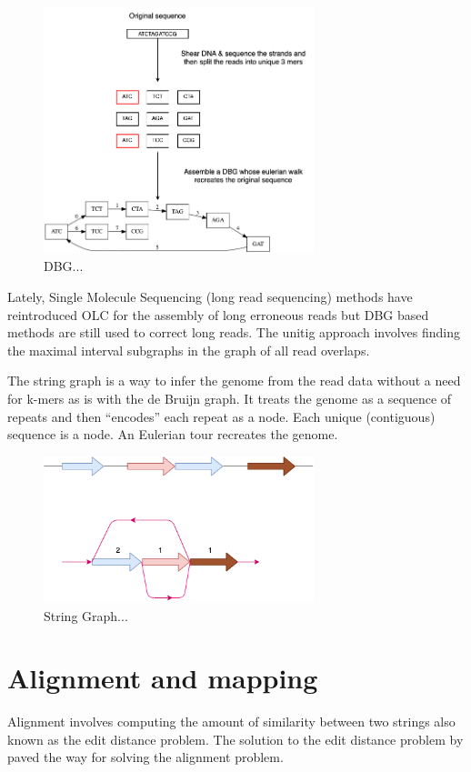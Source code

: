 \documentclass[11pt]{article}
\begin{document}
\begin{figure}[H]
\centering
\includegraphics[width=0.7\textwidth]{assets/images/de Bruijn Graph.png}
\caption{DBG...}
\end{figure}

Lately, Single Molecule Sequencing (long read sequencing)  methods have 
reintroduced OLC for the assembly of long erroneous reads but DBG based methods 
are still used to correct long reads.
The unitig approach involves finding the maximal interval subgraphs in the
graph of all read overlaps.

The string graph \cite{myersFragmentAssemblyString2005} is a way to infer the 
genome from the read data without a need for k-mers as is with the de Bruijn 
graph.  It treats the genome as a sequence of repeats and then “encodes” each 
repeat as a node. Each unique (contiguous) sequence is a node. 
An Eulerian tour recreates the genome.

\begin{figure}[H]
\centering
\includegraphics[width=0.7\textwidth]{assets/images/String Graph.png}
\caption{String Graph...}
\end{figure}\label{string graph}

\section{Alignment and mapping}
\label{sec:org17542ca}
Alignment involves computing the amount of similarity between two strings also 
known as the edit distance problem.
The solution to the edit distance problem by
\cite{levenshteinBinaryCodesCapable1966a} paved the way for solving the alignment
problem.
\end{document}
